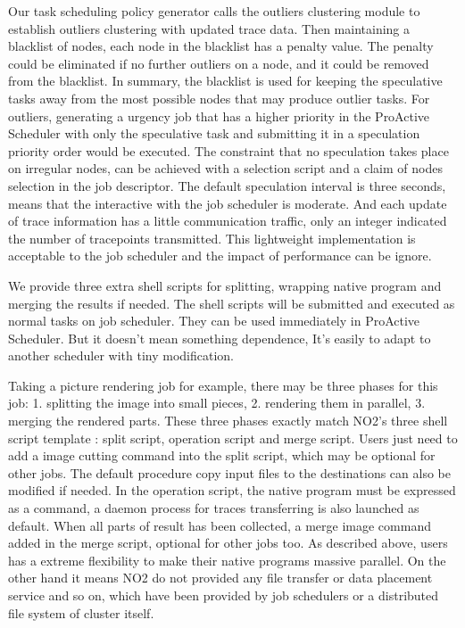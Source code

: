 Our task scheduling policy generator calls the outliers clustering module to establish outliers clustering with updated trace data. Then maintaining a blacklist of nodes, each node in the blacklist has a penalty value. The penalty could be eliminated if no further outliers on a node, and it could be removed from the blacklist. In summary, the blacklist is used for keeping the speculative tasks away from the most possible nodes that may produce outlier tasks. For outliers, generating a urgency job that has a higher priority in the ProActive Scheduler with only the speculative task and submitting it in a speculation priority order would be executed. The constraint that no speculation takes place on irregular nodes, can be achieved with a selection script and a claim of nodes selection in the job descriptor. The default speculation interval is three seconds, means that the interactive with the job scheduler is moderate. And each update of trace information has a little communication traffic, only an integer indicated the number of  tracepoints transmitted. This lightweight implementation is acceptable to the job scheduler and the impact of performance can be ignore.

We provide three extra shell scripts for splitting, wrapping native program and merging the results if needed. The shell scripts will be submitted and executed as normal tasks on job scheduler. They can be used immediately in ProActive Scheduler. But it doesn't mean something dependence, It’s easily to adapt to another scheduler with tiny modification.

Taking a picture rendering job for example, there may be three phases for this job: 1. splitting the image into small pieces, 2. rendering them in parallel, 3. merging the rendered parts. These three phases exactly match NO2's three shell script template : split script, operation script and merge script. Users just need to add a image cutting command into the split script, which may be optional for other jobs. The default procedure copy input files to the destinations can also be modified if needed. In the operation script, the native program must be expressed as a command, a daemon process for traces transferring is also launched as default. When all parts of result has been collected, a merge image command added in the merge script, optional for other jobs too. As described above,  users has a extreme flexibility to make their native programs massive parallel. On the other hand it means NO2 do not provided any file transfer or data placement service and so on, which have been provided by job schedulers or a distributed file system of cluster itself.
